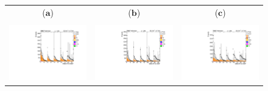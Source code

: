 \begin{figure}[htp]
\begin{tabular}{ccc}
   ($\mathbf{a}$)\qquad\qquad&($\mathbf{b}$)\qquad\qquad\qquad&($\mathbf{c}$)\qquad\qquad\qquad\\ \\
\hspace{-0.5cm}
\includegraphics[scale=0.3]{fig/chapt6/qcd/qcd_mu_ch/massH_cos_theta15_24.pdf}
& \hspace{-1.2cm} \includegraphics[scale=0.3]{fig/chapt6/qcd/qcd_mu_ch/massH_cos_theta24_43.pdf}
& \hspace{-1.2cm} \includegraphics[scale=0.3]{fig/chapt6/qcd/qcd_mu_ch/massH_cos_theta43_Inf.pdf}\\

\end{tabular}
\end{figure}
